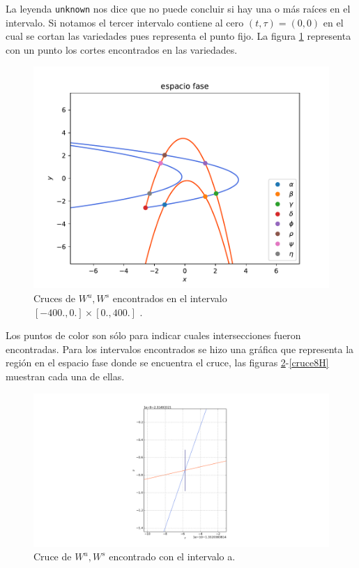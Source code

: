La leyenda \texttt{unknown} nos dice que no puede concluir si hay una o más raíces en el intervalo. Si notamos el tercer intervalo contiene al cero $(t,\tau)=(0,0)$ en el cual se cortan las variedades pues representa el punto fijo. La figura \ref{crucesH} representa con un punto los cortes encontrados en las variedades.
\begin{figure}[H]
\centering
\includegraphics[scale=0.5]{crucesL}
\caption{Cruces de $W^{u},W^{s}$ encontrados en el intervalo $[-400.,0.] \times [0.,400.]$ .}
\label{crucesH}
\end{figure}
Los puntos de color son sólo para indicar cuales intersecciones fueron encontradas. Para los intervalos encontrados se hizo una gráfica que representa la región en el espacio fase donde se encuentra el cruce, las figuras \ref{cruce1H}-\ref{cruce8H} muestran cada una de ellas.

\begin{figure}[H]
\centering
\includegraphics[scale=0.4]{cruce1}
\caption{Cruce de $W^{u},W^{s}$ encontrado con el intervalo a.}
\label{cruce1H}
\end{figure}

